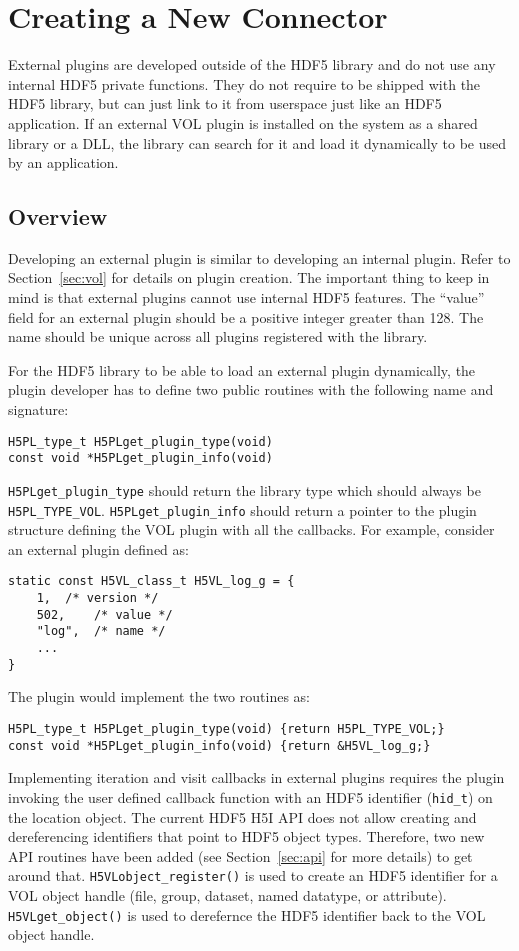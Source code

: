 \section{Creating a New Connector}
External plugins are developed outside of the HDF5 library and do not
use any internal HDF5 private functions. They do not require to be
shipped with the HDF5 library, but can just link to it from userspace
just like an HDF5 application. If an external VOL plugin is installed on the system as a shared library or a DLL, the library can search for it and load it dynamically to be used by an application.

\subsection{Overview}
Developing an external plugin is similar to developing an internal plugin. Refer to Section~\ref{sec:vol} for details on plugin creation. The important thing to keep in mind is that external plugins cannot use internal HDF5 features. The ``value'' field for an external plugin should be a positive integer greater than 128. The name should be unique across all plugins registered with the library.

For the HDF5 library to be able to load an external plugin dynamically, the plugin developer has to define two public routines with the following name and signature:
\begin{lstlisting}
H5PL_type_t H5PLget_plugin_type(void)
const void *H5PLget_plugin_info(void)
\end{lstlisting}
{\tt H5PLget\_plugin\_type} should return the library type which should always be {\tt H5PL\_TYPE\_VOL}. {\tt H5PLget\_plugin\_info} should return a pointer to the plugin structure defining the VOL plugin with all the callbacks. For example, consider an external plugin defined as:
\begin{lstlisting}
static const H5VL_class_t H5VL_log_g = {
    1,	/* version */
    502,	/* value */
    "log",	/* name */
    ...
}
\end{lstlisting}
The plugin would implement the two routines as:
\begin{lstlisting}
H5PL_type_t H5PLget_plugin_type(void) {return H5PL_TYPE_VOL;}
const void *H5PLget_plugin_info(void) {return &H5VL_log_g;}
\end{lstlisting}

Implementing iteration and visit callbacks in external plugins requires the plugin invoking the user defined callback function with an HDF5 identifier ({\tt hid\_t}) on the location object. The current HDF5 H5I API does not allow creating and dereferencing identifiers that point to HDF5 object types. Therefore, two new API routines have been added (see Section~\ref{sec:api} for more details) to get around that. {\tt H5VLobject\_register()} is used to create an HDF5 identifier for a VOL object handle (file, group, dataset, named datatype, or attribute). {\tt H5VLget\_object()} is used to derefernce the HDF5 identifier back to the VOL object handle.

